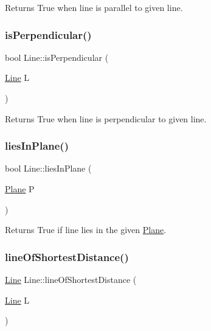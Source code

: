 Returns True when line is parallel to given line. 

\mbox{\label{class_line_adf08ea54b857c27d783321a3e6858222}} 
\subsubsection{\texorpdfstring{is\+Perpendicular()}{isPerpendicular()}}
{\footnotesize\ttfamily bool Line\+::is\+Perpendicular (\begin{DoxyParamCaption}\item[{\mbox{\hyperlink{class_line}{Line}}}]{L }\end{DoxyParamCaption})}



Returns True when line is perpendicular to given line. 

\mbox{\label{class_line_aad7d2a0b6ac395a1bd81d55dd2b7a81d}} 
\subsubsection{\texorpdfstring{lies\+In\+Plane()}{liesInPlane()}}
{\footnotesize\ttfamily bool Line\+::lies\+In\+Plane (\begin{DoxyParamCaption}\item[{\mbox{\hyperlink{class_plane}{Plane}}}]{P }\end{DoxyParamCaption})}



Returns True if line lies in the given \mbox{\hyperlink{class_plane}{Plane}}. 

\mbox{\label{class_line_a959d5169229a29c786deb42848ac8a1f}} 
\subsubsection{\texorpdfstring{line\+Of\+Shortest\+Distance()}{lineOfShortestDistance()}}
{\footnotesize\ttfamily \mbox{\hyperlink{class_line}{Line}} Line\+::line\+Of\+Shortest\+Distance (\begin{DoxyParamCaption}\item[{\mbox{\hyperlink{class_line}{Line}}}]{L }\end{DoxyParamCaption})}



